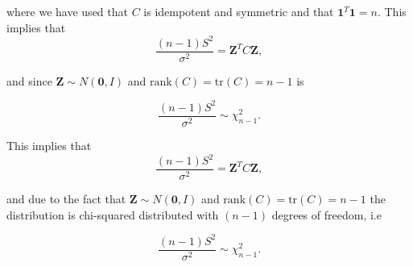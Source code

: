 where we have used that $C$ is idempotent and symmetric and that $\boldsymbol{1}^T\boldsymbol{1} = n$. This implies that 
\begin{equation*}
    \frac{(n-1)S^2}{\sigma^2} = \boldsymbol{Z}^TC\boldsymbol{Z},
\end{equation*}

and since $\boldsymbol{Z} \sim N(\boldsymbol{0}, I)$ and $\text{rank}(C) = \text{tr}(C) = n - 1$ is 

\begin{equation*}
    \frac{(n-1)S^2}{\sigma^2} \sim \chi_{n-1}^2.
\end{equation*}


This implies that 
\begin{equation*}
    \frac{(n-1)S^2}{\sigma^2} = \boldsymbol{Z}^TC\boldsymbol{Z},
\end{equation*}

and due to the fact that $\boldsymbol{Z} \sim N(\boldsymbol{0}, I)$ and $\text{rank}(C) = \text{tr}(C) = n - 1$ the distribution %
is chi-squared distributed with $(n-1)$ degrees of freedom, i.e

\begin{equation*}
    \frac{(n-1)S^2}{\sigma^2} \sim \chi_{n-1}^2.
\end{equation*}